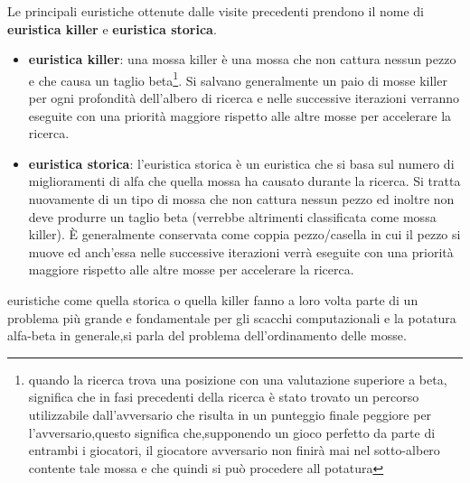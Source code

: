 Le principali euristiche ottenute dalle visite precedenti prendono il nome di \textbf{euristica killer} e \textbf{euristica storica}.
\begin{itemize}
  \item  \textbf{euristica killer}: una mossa killer è una mossa che non cattura nessun pezzo e che causa un taglio beta\footnote{quando la ricerca trova 
  una posizione con una valutazione  superiore a beta, significa che in fasi precedenti della ricerca è stato trovato un percorso utilizzabile 
   dall'avversario che risulta in un punteggio finale peggiore per l'avversario,questo significa che,supponendo un gioco
   perfetto da parte di entrambi i giocatori, il giocatore avversario non finirà mai nel sotto-albero contente tale mossa e che quindi si 
   può procedere all potatura}. Si salvano generalmente un paio di mosse killer per ogni profondità dell'albero di ricerca e nelle successive iterazioni
   verranno eseguite con una priorità maggiore rispetto alle altre mosse per accelerare la ricerca. 
  \item \textbf{euristica storica}: l'euristica storica è un euristica che si basa sul numero di miglioramenti di alfa che quella mossa ha causato
   durante la ricerca. Si tratta nuovamente di un tipo di mossa che non cattura nessun pezzo ed inoltre non deve produrre un taglio beta
  (verrebbe altrimenti classificata come mossa killer). È generalmente conservata come coppia pezzo/casella in cui il pezzo si muove 
  ed anch'essa  nelle successive iterazioni verrà eseguite con una priorità maggiore rispetto alle altre mosse per accelerare la ricerca. 
\end{itemize} 
euristiche come quella storica o quella killer fanno a loro volta parte di un problema più grande e fondamentale per gli scacchi computazionali 
e la potatura alfa-beta in generale,si parla del problema dell'ordinamento delle mosse.

